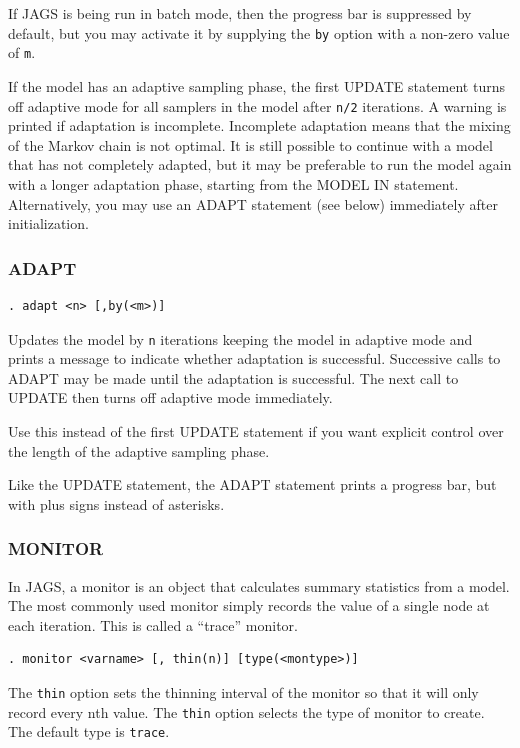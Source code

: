 \documentclass[11pt, a4paper, titlepage]{report}
\newcommand{\JAGS}{\textsf{JAGS}}
\begin{document}
If JAGS is being run in batch mode, then the progress bar is
suppressed by default, but you may activate it by supplying the
\texttt{by} option with a non-zero value of \texttt{m}.

If the model has an adaptive sampling phase, the first UPDATE
statement turns off adaptive mode for all samplers in the model after
\texttt{n/2} iterations. A warning is printed if adaptation is
incomplete. Incomplete adaptation means that the mixing of the Markov
chain is not optimal. It is still possible to continue with a model
that has not completely adapted, but it may be preferable to run the
model again with a longer adaptation phase, starting from the MODEL IN
statement. Alternatively, you may use an ADAPT statement (see below)
immediately after initialization.

\subsubsection{ADAPT}
\label{section:adapt}

\begin{verbatim}
. adapt <n> [,by(<m>)]
\end{verbatim}
Updates the model by \texttt{n} iterations keeping the model in
adaptive mode and prints a message to indicate whether adaptation is
successful.  Successive calls to ADAPT may be made until the
adaptation is successful. The next call to UPDATE then turns off
adaptive mode immediately.

Use this instead of the first UPDATE statement if you want explicit
control over the length of the adaptive sampling phase.

Like the UPDATE statement, the ADAPT statement prints a progress
bar, but with plus signs instead of asterisks.

\subsubsection{MONITOR}
\label{section:monitor}

In \JAGS, a monitor is an object that calculates summary statistics
from a model.  The most commonly used monitor simply records the value
of a single node at each iteration.  This is called a ``trace''
monitor. 
\begin{verbatim}
. monitor <varname> [, thin(n)] [type(<montype>)]
\end{verbatim}
The \texttt{thin} option sets the thinning interval of the monitor so
that it will only record every nth value. The \texttt{thin} option 
selects the type of monitor to create. The default type is \texttt{trace}.
\end{document}
